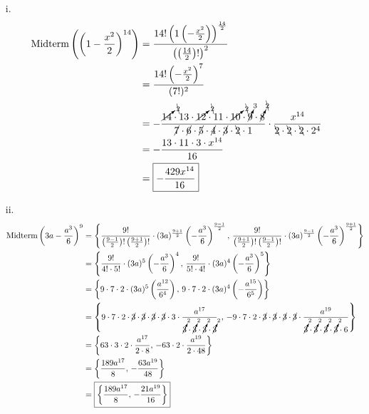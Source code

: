 \documentclass{article}
\DeclareMathOperator{\Midterm}{Midterm}
\begin{document}
\begin{itemize}
\begin{itemize}
	\item[i.]
	\begin{align*}
		\Midterm\left(\left(1-\frac{x^2}{2}\right)^{14}\right)
		&=\frac{14!\left(1\left(-\frac{x^2}{2}\right)\right)^
			{\frac{14}{2}}}{\left(\left(\frac{14}{2}\right)!
			\right)^2} \\
		&=\frac{14!\left(-\frac{x^2}{2}\right)^7}{(7!)^2} \\
		&=-\frac{\cancelto{\bcancel{2}}{14}\cdot13\cdot
			\cancelto{\bcancel{2}}{12}\cdot11\cdot
			\cancelto{\bcancel{2}}{10}\cdot\cancelto{3}{9}
			\cdot\cancelto{\bcancel{2}}{8}}{\cancel{7}\cdot
			\cancel{6}\cdot\cancel{5}\cdot\cancel{4}\cdot
			\cancel{3}\cdot\bcancel{2}\cdot1}\cdot\frac{x^{14}}
			{\bcancel{2}\cdot\bcancel{2}\cdot\bcancel{2}\cdot2^4} \\
		&=-\frac{13\cdot11\cdot3\cdot x^{14}}{16} \\
		&=\boxed{-\frac{429x^{14}}{16}}
	\end{align*}
	\item[ii.]
	\begin{align*}
		\Midterm\left(3a-\frac{a^3}{6}\right)^9
		&=\left\lbrace
			\frac{9!}{\left(\frac{9-1}{2}\right)!\left(
			\frac{9+1}{2}\right)!}\cdot(3a)^{\frac{9+1}{2}}
			\left(-\frac{a^3}{6}\right)^{\frac{9-1}{2}},\,
			\frac{9!}{\left(\frac{9+1}{2}\right)!\left(
			\frac{9-1}{2}\right)!}\cdot(3a)^{\frac{9-1}{2}}
			\left(-\frac{a^3}{6}\right)^{\frac{9+1}{2}}
			\right\rbrace \\
		&=\left\lbrace
			\frac{9!}{4!\cdot5!}\cdot(3a)^5
			\left(-\frac{a^3}{6}\right)^4,\,
			\frac{9!}{5!\cdot4!}\cdot(3a)^4
			\left(-\frac{a^3}{6}\right)^5
			\right\rbrace \\
		&=\left\lbrace
			9\cdot7\cdot2\cdot(3a)^5\left(\frac{a^{12}}{6^4}\right),\,
			9\cdot7\cdot2\cdot(3a)^4\left(-\frac{a^{15}}{6^5}\right)
			\right\rbrace \\
		&=\left\lbrace
			9\cdot7\cdot2\cdot\cancel{3}\cdot\cancel{3}\cdot
			\cancel{3}\cdot\cancel{3}\cdot3\cdot\frac{a^{17}}
			{\cancelto{2}{3}\cdot\cancelto{2}{3}\cdot
			\cancelto{2}{3}\cdot\cancelto{2}{3}}\;\,,\,
			-9\cdot7\cdot2\cdot\cancel{3}\cdot\cancel{3}\cdot
			\cancel{3}\cdot\cancel{3}\cdot\frac{a^{19}}
			{\cancelto{2}{3}\cdot\cancelto{2}{3}\cdot
			\cancelto{2}{3}\cdot\cancelto{2}{3}\cdot6}
			\right\rbrace \\
		&=\left\lbrace
			63\cdot3\cdot2\cdot\frac{a^{17}}{2\cdot8},\,
			-63\cdot2\cdot\frac{a^{19}}{2\cdot48}
			\right\rbrace \\
		&=\left\lbrace
			\frac{189a^{17}}{8},\,
			-\frac{63a^{19}}{48}
			\right\rbrace \\
		&=\boxed{\left\lbrace
			\frac{189a^{17}}{8},\,
			-\frac{21a^{19}}{16}
			\right\rbrace}
	\end{align*}
\end{itemize}
\end{itemize}
\end{document}

